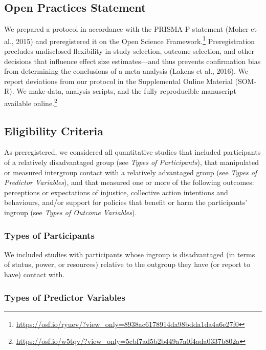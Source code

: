 \documentclass[12pt, letterpaper]{article}
\begin{document}
\hypertarget{open-practices-statement}{%
\subsection{Open Practices Statement}\label{open-practices-statement}}

We prepared a protocol in accordance with the PRISMA-P statement (Moher
et al., 2015) and preregistered it on the Open Science
Framework.\footnote{\url{https://osf.io/ryuev/?view_only=8938ac6178914da98bdda1da4a6e27f0}}
Preregistration precludes undisclosed flexibility in study selection,
outcome selection, and other decisions that influence effect size
estimates---and thus prevents confirmation bias from determining the
conclusions of a meta-analysis (Lakens et al., 2016). We report
deviations from our protocol in the Supplemental Online Material
(SOM-R). We make data, analysis scripts, and the fully reproducible
manuscript available online.\footnote{\url{https://osf.io/w5tqv/?view_only=5cbf7ad5b2b449a7a0f4ada0337b802a}}

\hypertarget{eligibility-criteria}{%
\subsection{Eligibility Criteria}\label{eligibility-criteria}}

As preregistered, we considered all quantitative studies that included
participants of a relatively disadvantaged group (see \emph{Types of
Participants}), that manipulated or measured intergroup contact with a
relatively advantaged group (see \emph{Types of Predictor Variables}),
and that measured one or more of the following outcomes: perceptions or
expectations of injustice, collective action intentions and behaviours,
and/or support for policies that benefit or harm the participants'
ingroup (see \emph{Types of Outcome Variables}).

\hypertarget{types-of-participants}{%
\subsubsection{Types of Participants}\label{types-of-participants}}

We included studies with participants whose ingroup is disadvantaged (in
terms of status, power, or resources) relative to the outgroup they have
(or report to have) contact with.

\hypertarget{types-of-predictor-variables}{%
\subsubsection{Types of Predictor
Variables}\label{types-of-predictor-variables}}
\end{document}
